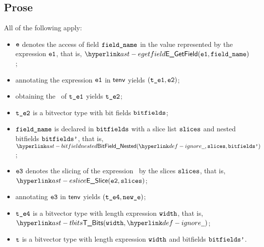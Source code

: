 \subsection{Prose}
All of the following apply:
\begin{itemize}
  \item $\texttt{e}$ denotes the access of field $\texttt{field\_name}$ in the value represented by the expression $\texttt{e1}$, that is, $\EGetField(\veone, \fieldname)$;
  \item annotating the expression $\texttt{e1}$ in $\textsf{tenv}$ yields $(\texttt{t\_e1}, \texttt{e2})$\ProseOrTypeError;
  \item obtaining the \underlyingtype\ of $\texttt{t\_e1}$ yields $\texttt{t\_e2}$\ProseOrTypeError;
  \item $\texttt{t\_e2}$ is a bitvector type with bit fields $\texttt{bitfields}$;
  \item $\texttt{field\_name}$ is declared in $\texttt{bitfields}$ with a slice list $\texttt{slices}$ and nested bitfields $\texttt{bitfields'}$, that is,
        $\BitFieldNested(\Ignore, \slices, \bitfieldsp)$;
  \item $\texttt{e3}$ denotes the slicing of the expression \vetwo\ by the slices $\texttt{slices}$, that is, \\ $\ESlice(\vetwo, \slices)$;
  \item annotating $\texttt{e3}$ in $\textsf{tenv}$ yields $(\texttt{t\_e4}, \texttt{new\_e})$\ProseOrTypeError;
  \item $\texttt{t\_e4}$ is a bitvector type with length expression $\texttt{width}$, that is, $\TBits(\width, \Ignore)$;
  \item $\texttt{t}$ is a bitvector type with length expression $\texttt{width}$ and bitfields $\texttt{bitfields'}$.
\end{itemize}



